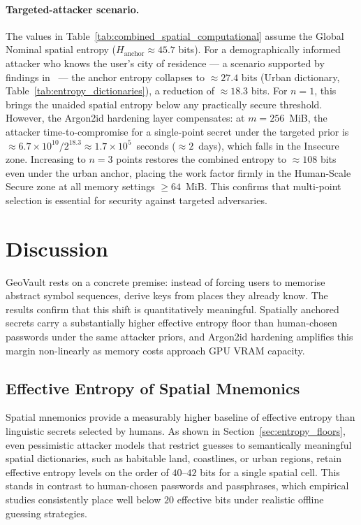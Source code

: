 \documentclass[journal,article,accept,pdftex,moreauthors]{Definitions/mdpi}
\begin{document}
\paragraph{Targeted-attacker scenario.} The values in Table~\ref{tab:combined_spatial_computational} assume the Global Nominal spatial entropy ($H_{\text{anchor}} \approx 45.7$ bits). For a demographically informed attacker who knows the user's city of residence — a scenario supported by findings in~\cite{Sun2012, Thorpe2013, AlAmeen2014} — the anchor entropy collapses to $\approx 27.4$ bits (Urban dictionary, Table~\ref{tab:entropy_dictionaries}), a reduction of $\approx 18.3$ bits. For $n=1$, this brings the unaided spatial entropy below any practically secure threshold. However, the Argon2id hardening layer compensates: at $m = 256$~MiB, the attacker time-to-compromise for a single-point secret under the targeted prior is $\approx 6.7 \times 10^{10} / 2^{18.3} \approx 1.7 \times 10^{5}$~seconds ($\approx 2$~days), which falls in the Insecure zone. Increasing to $n = 3$ points restores the combined entropy to $\approx 108$ bits even under the urban anchor, placing the work factor firmly in the Human-Scale Secure zone at all memory settings $\ge 64$~MiB. This confirms that multi-point selection is essential for security against targeted adversaries.



\section{Discussion}

GeoVault rests on a concrete premise: instead of forcing users to memorise abstract symbol sequences, derive keys from places they already know. The results confirm that this shift is quantitatively meaningful. Spatially anchored secrets carry a substantially higher effective entropy floor than human-chosen passwords under the same attacker priors, and Argon2id hardening amplifies this margin non-linearly as memory costs approach GPU VRAM capacity.

\subsection{Effective Entropy of Spatial Mnemonics}

Spatial mnemonics provide a measurably higher baseline of effective entropy than linguistic secrets selected by humans. As shown in Section~\ref{sec:entropy_floors}, even pessimistic attacker models that restrict guesses to semantically meaningful spatial dictionaries, such as habitable land, coastlines, or urban regions, retain effective entropy levels on the order of $40$--$42$ bits for a single spatial cell. This stands in contrast to human-chosen passwords and passphrases, which empirical studies consistently place well below $20$ effective bits under realistic offline guessing strategies.
\end{document}
